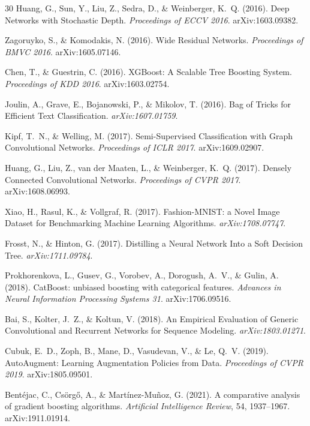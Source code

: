 \documentclass[10pt,twocolumn]{article}
\begin{document}
\begin{thebibliography}{30}
Huang, G., Sun, Y., Liu, Z., Sedra, D., \& Weinberger, K.~Q. (2016).
Deep Networks with Stochastic Depth.
\textit{Proceedings of ECCV 2016}. arXiv:1603.09382.

Zagoruyko, S., \& Komodakis, N. (2016).
Wide Residual Networks.
\textit{Proceedings of BMVC 2016}. arXiv:1605.07146.

Chen, T., \& Guestrin, C. (2016).
XGBoost: A Scalable Tree Boosting System.
\textit{Proceedings of KDD 2016}. arXiv:1603.02754.

Joulin, A., Grave, E., Bojanowski, P., \& Mikolov, T. (2016).
Bag of Tricks for Efficient Text Classification. \textit{arXiv:1607.01759}.

Kipf, T.~N., \& Welling, M. (2017).
Semi-Supervised Classification with Graph Convolutional Networks.
\textit{Proceedings of ICLR 2017}. arXiv:1609.02907.

Huang, G., Liu, Z., van der Maaten, L., \& Weinberger, K.~Q. (2017).
Densely Connected Convolutional Networks.
\textit{Proceedings of CVPR 2017}. arXiv:1608.06993.

Xiao, H., Rasul, K., \& Vollgraf, R. (2017).
Fashion-MNIST: a Novel Image Dataset for Benchmarking Machine Learning Algorithms.
\textit{arXiv:1708.07747}.

Frosst, N., \& Hinton, G. (2017).
Distilling a Neural Network Into a Soft Decision Tree. \textit{arXiv:1711.09784}.

Prokhorenkova, L., Gusev, G., Vorobev, A., Dorogush, A.~V., \& Gulin, A. (2018).
CatBoost: unbiased boosting with categorical features.
\textit{Advances in Neural Information Processing Systems 31}. arXiv:1706.09516.

Bai, S., Kolter, J.~Z., \& Koltun, V. (2018).
An Empirical Evaluation of Generic Convolutional and Recurrent Networks for Sequence Modeling.
\textit{arXiv:1803.01271}.

Cubuk, E.~D., Zoph, B., Mane, D., Vasudevan, V., \& Le, Q.~V. (2019).
AutoAugment: Learning Augmentation Policies from Data.
\textit{Proceedings of CVPR 2019}. arXiv:1805.09501.

Bentéjac, C., Csörgő, A., \& Martínez-Muñoz, G. (2021).
A comparative analysis of gradient boosting algorithms.
\textit{Artificial Intelligence Review}, 54, 1937--1967. arXiv:1911.01914.


\end{thebibliography}
\end{document}
